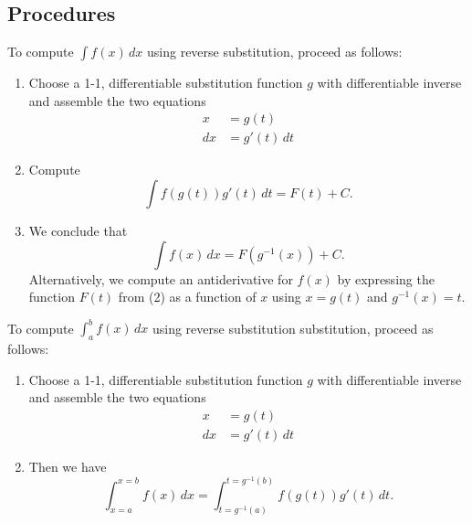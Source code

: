 \subsection*{Procedures}
\begin{namedtheorem} To compute $\displaystyle\int f(x)\, dx$ using reverse substitution, proceed as follows:
\begin{enumerate}[topsep=0pt, itemsep=0pt]
  \item Choose a 1-1, differentiable substitution function $g$ with differentiable inverse and assemble the two equations
  \begin{align*}
    x&=g(t)\\
    dx&=g'(t)\, dt
  \end{align*}
  \item Compute
  \[
  \int f(g(t))g'(t)\, dt=F(t)+C.
  \]
  \item We conclude that
  \[
  \int f(x)\, dx=F(g^{-1}(x))+C.
  \]
  Alternatively, we compute an antiderivative for $f(x)$ by expressing the function $F(t)$ from (2) as a function of $x$ using $x=g(t)$ and $g^{-1}(x)=t$.
\end{enumerate}

\end{namedtheorem}
\begin{samepage}
\begin{namedtheorem} To compute $\displaystyle\int_a^b f(x)\, dx$ using reverse substitution substitution, proceed as follows:
\begin{enumerate}[topsep=0pt, itemsep=0pt]
  \item Choose a 1-1, differentiable substitution function $g$ with differentiable inverse and assemble the two equations
  \begin{align*}
    x&=g(t)\\
    dx&=g'(t)\, dt
  \end{align*}
  \item
  Then we have
  \[
  \displaystyle\int_{x=a}^{x=b} f(x)\, dx=\int_{t=g^{-1}(a)}^{t=g^{-1}(b)}f(g(t))g'(t)\, dt.
  \]
\end{enumerate}

\end{namedtheorem}
\end{samepage}
\begin{comment}
What is the difference between our original (forward) substitution and reverse subsitution?
\begin{itemize}
  \item Forward substitution allows us to find an antiderivative of $f(u(x))u'(x)$ from an antiderivative of $f(x)$: namely,
  \[
  F(x) \text{ is an antiderivative of } f(x)\implies F(u(x)) \text{ is an antiderivative  of } f(u(x))u'(x).
  \]
  \item Reverse substitution allows us to find an antiderivative of $f(x)$ from an antiderivative of $f(g(t))g'(t)$: namely,
  \[
  F(t) \text{ is an antiderivative of } f(g(t))g'(t)\implies F(g^{-1}(x)) \text{ is an antiderivative  of } f(x).
  \]
\end{itemize}
\end{comment}
